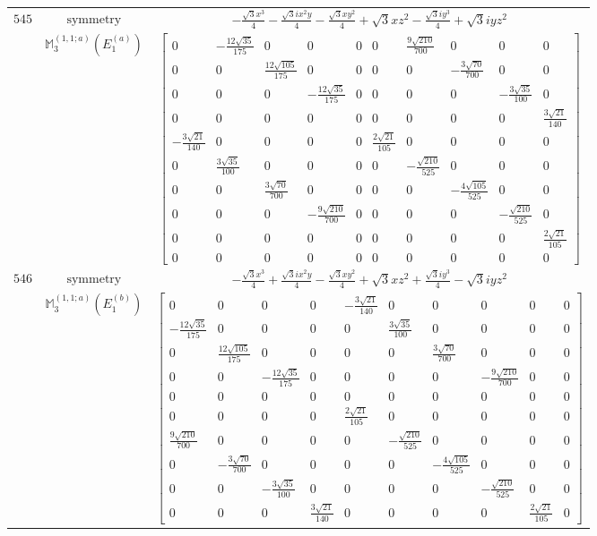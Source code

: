 \documentclass[fleqn,8pt,landscape]{jsarticle}
\begin{document}
\begin{longtable}{ccc}
$ 545 $ & $ \text{symmetry} $ & $ - \frac{\sqrt{3} x^{3}}{4} - \frac{\sqrt{3} i x^{2} y}{4} - \frac{\sqrt{3} x y^{2}}{4} + \sqrt{3} x z^{2} - \frac{\sqrt{3} i y^{3}}{4} + \sqrt{3} i y z^{2} $ \\
$  $ & $ \mathbb{M}_{3}^{(1,1;a)}(E_{1}^{(a)}) $ & $ \begin{bmatrix} 0 & - \frac{12 \sqrt{35}}{175} & 0 & 0 & 0 & 0 & \frac{9 \sqrt{210}}{700} & 0 & 0 & 0 \\ 0 & 0 & \frac{12 \sqrt{105}}{175} & 0 & 0 & 0 & 0 & - \frac{3 \sqrt{70}}{700} & 0 & 0 \\ 0 & 0 & 0 & - \frac{12 \sqrt{35}}{175} & 0 & 0 & 0 & 0 & - \frac{3 \sqrt{35}}{100} & 0 \\ 0 & 0 & 0 & 0 & 0 & 0 & 0 & 0 & 0 & \frac{3 \sqrt{21}}{140} \\ - \frac{3 \sqrt{21}}{140} & 0 & 0 & 0 & 0 & \frac{2 \sqrt{21}}{105} & 0 & 0 & 0 & 0 \\ 0 & \frac{3 \sqrt{35}}{100} & 0 & 0 & 0 & 0 & - \frac{\sqrt{210}}{525} & 0 & 0 & 0 \\ 0 & 0 & \frac{3 \sqrt{70}}{700} & 0 & 0 & 0 & 0 & - \frac{4 \sqrt{105}}{525} & 0 & 0 \\ 0 & 0 & 0 & - \frac{9 \sqrt{210}}{700} & 0 & 0 & 0 & 0 & - \frac{\sqrt{210}}{525} & 0 \\ 0 & 0 & 0 & 0 & 0 & 0 & 0 & 0 & 0 & \frac{2 \sqrt{21}}{105} \\ 0 & 0 & 0 & 0 & 0 & 0 & 0 & 0 & 0 & 0 \end{bmatrix} $ \\ \hline
$ 546 $ & $ \text{symmetry} $ & $ - \frac{\sqrt{3} x^{3}}{4} + \frac{\sqrt{3} i x^{2} y}{4} - \frac{\sqrt{3} x y^{2}}{4} + \sqrt{3} x z^{2} + \frac{\sqrt{3} i y^{3}}{4} - \sqrt{3} i y z^{2} $ \\
$  $ & $ \mathbb{M}_{3}^{(1,1;a)}(E_{1}^{(b)}) $ & $ \begin{bmatrix} 0 & 0 & 0 & 0 & - \frac{3 \sqrt{21}}{140} & 0 & 0 & 0 & 0 & 0 \\ - \frac{12 \sqrt{35}}{175} & 0 & 0 & 0 & 0 & \frac{3 \sqrt{35}}{100} & 0 & 0 & 0 & 0 \\ 0 & \frac{12 \sqrt{105}}{175} & 0 & 0 & 0 & 0 & \frac{3 \sqrt{70}}{700} & 0 & 0 & 0 \\ 0 & 0 & - \frac{12 \sqrt{35}}{175} & 0 & 0 & 0 & 0 & - \frac{9 \sqrt{210}}{700} & 0 & 0 \\ 0 & 0 & 0 & 0 & 0 & 0 & 0 & 0 & 0 & 0 \\ 0 & 0 & 0 & 0 & \frac{2 \sqrt{21}}{105} & 0 & 0 & 0 & 0 & 0 \\ \frac{9 \sqrt{210}}{700} & 0 & 0 & 0 & 0 & - \frac{\sqrt{210}}{525} & 0 & 0 & 0 & 0 \\ 0 & - \frac{3 \sqrt{70}}{700} & 0 & 0 & 0 & 0 & - \frac{4 \sqrt{105}}{525} & 0 & 0 & 0 \\ 0 & 0 & - \frac{3 \sqrt{35}}{100} & 0 & 0 & 0 & 0 & - \frac{\sqrt{210}}{525} & 0 & 0 \\ 0 & 0 & 0 & \frac{3 \sqrt{21}}{140} & 0 & 0 & 0 & 0 & \frac{2 \sqrt{21}}{105} & 0 \end{bmatrix} $ \\ \hline

\end{longtable}
\end{document}
